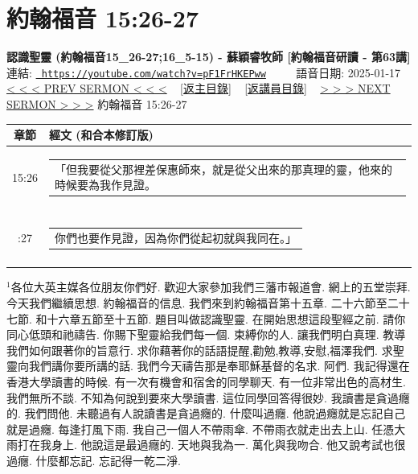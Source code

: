 \documentclass{book}
\begin{document}
\section{約翰福音 15:26-27}
\label{sec:pF1FrHKEPww}
\textbf{認識聖靈 (約翰福音15\_26-27;16\_5-15) - 蘇穎睿牧師 [約翰福音研讀 - 第63講]}
\newline
\newline
連結: \href{https://youtube.com/watch?v=pF1FrHKEPww}{\texttt{ https://youtube.com/watch?v=pF1FrHKEPww}} ~~~~ 語音日期: 2025-01-17 
\newline
\newline
\hyperref[sec:GDV7iT9TooA]{< < < PREV SERMON < < <}
~
\hyperlink{toc}{[返主目錄]}
~
\hyperref[ch:preacher5]{[返講員目錄]}
~
\hyperref[sec:M4alGuubf1o]{> > > NEXT SERMON > > >}
\newline
\newline
約翰福音 15:26-27
\newline
\begin{longtable}{cl}
\hline
\hline
章節 & 經文 (和合本修訂版)\\
\hline
15:26 & \begin{tabularx}{0.7\textwidth}{X} 「但我要從父那裡差保惠師來，就是從父出來的那真理的靈，他來的時候要為我作見證。 \end{tabularx} \\ \\ \relax
15:27 & \begin{tabularx}{0.7\textwidth}{X} 你們也要作見證，因為你們從起初就與我同在。」 \end{tabularx} \\ \\
[1ex]
\hline
\hline
\end{longtable}
$^{1}$各位大英主媒各位朋友你們好.
歡迎大家參加我們三藩市報道會.
網上的五堂崇拜.
今天我們繼續思想.
約翰福音的信息.
我們來到約翰福音第十五章.
二十六節至二十七節.
和十六章五節至十五節.
題目叫做認識聖靈.
在開始思想這段聖經之前.
請你同心低頭和祂禱告.
你賜下聖靈給我們每一個.
束縛你的人.
讓我們明白真理.
教導我們如何跟著你的旨意行.
求你藉著你的話語提醒,勸勉,教導,安慰,福澤我們.
求聖靈向我們講你要所講的話.
我們今天禱告那是奉耶穌基督的名求.
阿們.
我記得還在香港大學讀書的時候.
有一次有機會和宿舍的同學聊天.
有一位非常出色的高材生.
我們無所不談.
不知為何說到要來大學讀書.
這位同學回答得很妙.
我讀書是貪過癮的.
我們問他.
未聽過有人說讀書是貪過癮的.
什麼叫過癮.
他說過癮就是忘記自己就是過癮.
每逢打風下雨.
我自己一個人不帶雨傘.
不帶雨衣就走出去上山.
任憑大雨打在我身上.
他說這是最過癮的.
天地與我為一.
萬化與我吻合.
他又說考試也很過癮.
什麼都忘記.
忘記得一乾二淨.
\end{document}
